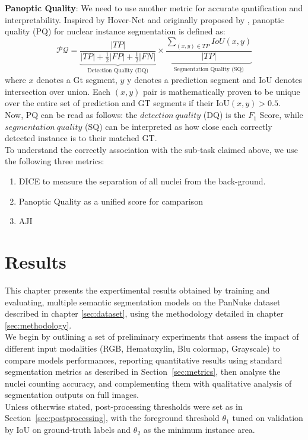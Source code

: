 \documentclass[target=bach,aauheader=,style=]{thud}
\begin{document}
\textbf{Panoptic Quality}: We need to use another metric for accurate qantification and interpretability. Inspired by Hover-Net and originally proposed by \cite{kirillov2019panoptic}, panoptic quality (PQ) for nuclear instance segmentation is defined as:
\begin{equation}
\mathcal{PQ} =
\underbrace{\frac{|TP|}
{|TP| + \tfrac{1}{2}|FP| + \tfrac{1}{2}|FN|}}_{\text{Detection Quality (DQ)}}
\times
\underbrace{\frac{\sum_{(x,y) \in TP} IoU(x,y)}
{|TP|}}_{\text{Segmentation Quality (SQ)}}
\end{equation}
where $x$ denotes a Gt segment, $y$ y denotes a prediction segment and IoU denotes intersection over union. Each $(x,y)$ pair is mathematically proven to be unique over the entire set of prediction and GT segments if their IoU$(x,y)>0.5$. \\
Now, PQ can be read as follows: the $detection\ quality$ (DQ) is the $F_1$ Score, while $segmentation\ quality$ (SQ) can be interpreted as how close each correctly detected instance is to their matched GT.\\

To understand the correctly association with the sub-task claimed above, we use the following three metrics:
\begin{enumerate}
    \item DICE to measure the separation of all nuclei from the back-ground.
    \item Panoptic Quality as a unified score for camparison
    \item AJI
\end{enumerate}
\chapter{Results}
\label{sec:results}
This chapter presents the expertimental results obtained by training and evaluating, multiple semantic segmentation models on the PanNuke dataset described in chapter \ref{sec:dataset}, using the methodology detailed in chapter \ref{sec:methodology}.\\
We begin by outlining a set of preliminary experiments that assess the impact of different input modalities (RGB, Hematoxylin, Blu colormap, Grayscale) to compare models performances, reporting quantitative results using standard segmentation metrics as described in Section~\ref{sec:metrics}, then analyse the nuclei counting accuracy, and complementing them with qualitative analysis of segmentation outputs on full images.\\
Unless otherwise stated, post-processing thresholds were set as in Section~\ref{sec:postprocessing}, with the foreground threshold $\theta_1$ tuned on validation by IoU on ground-truth labels and $\theta_2$ as the minimum instance area.
\end{document}

